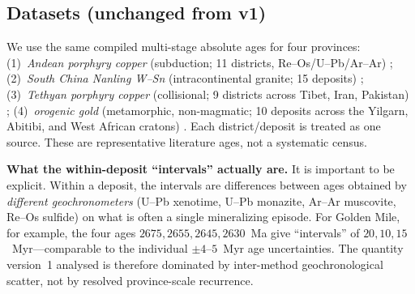 \documentclass[12pt,a4paper]{article}
\begin{document}
\subsection{Datasets (unchanged from v1)}
We use the same compiled multi-stage absolute ages for four provinces:
(1)~\emph{Andean porphyry copper} (subduction; 11 districts, Re--Os/U--Pb/Ar--Ar)
\citep{maksaev2004,romero2011,deckart2013};
(2)~\emph{South China Nanling W--Sn} (intracontinental granite; 15 deposits)
\citep{mao2017,zhou2016};
(3)~\emph{Tethyan porphyry copper} (collisional; 9 districts across Tibet, Iran,
Pakistan) \citep{hou2009,yang2017};
(4)~\emph{orogenic gold} (metamorphic, non-magmatic; 10 deposits across the
Yilgarn, Abitibi, and West African cratons) \citep{vielreicher2010,pelletier2022,oberthur1998}.
Each district/deposit is treated as one source. These are representative
literature ages, not a systematic census.

\noindent\textbf{What the within-deposit ``intervals'' actually are.} It is
important to be explicit. Within a deposit, the intervals are differences between
ages obtained by \emph{different geochronometers} (U--Pb xenotime, U--Pb
monazite, Ar--Ar muscovite, Re--Os sulfide) on what is often a single
mineralizing episode. For Golden Mile, for example, the four ages
$2675,2655,2645,2630$~Ma give ``intervals'' of $20,10,15$~Myr---comparable to the
individual $\pm4$--$5$~Myr age uncertainties. The quantity version~1 analysed is
therefore dominated by inter-method geochronological scatter, not by resolved
province-scale recurrence.
\end{document}
